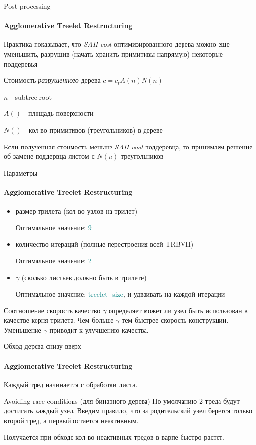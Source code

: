 \documentclass{beamer}
\begin{document}
\begin{frame}{Post-processing}
    \framesubtitle{Agglomerative Treelet Restructuring}

    Практика показывает, что \textit{SAH-cost} оптимизированного дерева можно еще уменьшить,
    разрушив (начать хранить примитивы напрямую) некоторые поддеревья

    \begin{block}{Стоимость \textit{разрушенного} дерева}
        \(
        c = c_t A(n) N(n)
        \)

        $n$ - subtree root

        $A()$ - площадь поверхности

        $N()$ - кол-во примитивов (треугольников) в дереве
    \end{block}
    Если полученная стоимость меньше \textit{SAH-cost} поддеревца, то принимаем решение об замене
    поддервца листом с $N(n)$ треугольников
\end{frame}

\begin{frame}{Параметры}
    \framesubtitle{Agglomerative Treelet Restructuring}
    \begin{itemize}
        \item
            размер трилета (кол-во узлов на трилет)

            Оптимальное значение: \textcolor{teal}{9}
        \item
            количество итераций (полные перестроения всей TRBVH)

            Оптимальное значение: \textcolor{teal}{2}
        \item
            $\gamma$ (сколько листьев должно быть в трилете)

            Оптимальное значение: \textcolor{teal}{treelet\_size}, и удваивать на каждой итерации
    \end{itemize}

    \begin{block}{Соотношение скорость качество}
        $\gamma$ определяет может ли узел быть использован в качестве корня трилета.
        Чем больше $\gamma$ тем быстрее скорость конструкции. Уменьшение $\gamma$ приводит к улучшению качества.

    \end{block}

\end{frame}

\begin{frame}[t]{Обход дерева снизу вверх}
    \framesubtitle{Agglomerative Treelet Restructuring}
    Каждый тред начинается с обработки листа.
    \begin{block}{Avoiding race conditions (для бинарного дерева)}
        По умолчанию 2 треда будут достигать каждый узел.
        Введим правило, что за родительский узел берется только второй тред, а первый остается неактивным.
    \end{block}
    Получается при обходе кол-во неактивных тредов в варпе быстро растет.
\end{frame}
\end{document}
